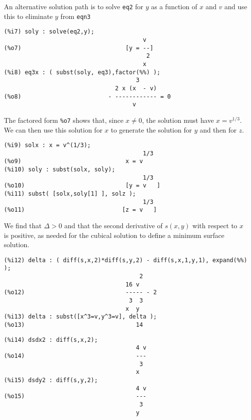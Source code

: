 \documentclass[12pt]{article}
\begin{document}
\smallskip

An alternative solution path is to solve \verb|eq2| for $y$ as a function of $x$ and $v$
  and use this to eliminate $y$ from \verb|eqn3|
\small
\begin{verbatim}
(%i7) soly : solve(eq2,y);
                                        v
(%o7)                              [y = --]
                                         2
                                        x
(%i8) eq3x : ( subst(soly, eq3),factor(%%) );
                                      3
                                2 x (x  - v)
(%o8)                         - ------------ = 0
                                     v
\end{verbatim}
\normalsize
The factored form \verb|%o7| shows that, since $x \neq 0$, the solution
  must have $x = v^{1/3}$.
We can then use this solution for $x$ to generate the solution for $y$
  and then for $z$.
\small
\begin{verbatim}
(%i9) solx : x = v^(1/3);
                                        1/3
(%o9)                              x = v
(%i10) soly : subst(solx, soly);
                                        1/3
(%o10)                             [y = v   ]
(%i11) subst( [solx,soly[1] ], solz );
                                        1/3
(%o11)                            [z = v   ]
\end{verbatim}
\normalsize
We find that $\Delta > 0$ and that  the second derivative of $s(x,y)$ with
  respect to $x$ is positive, as needed for the cubical solution to
  define a minimum surface solution.
\small
\begin{verbatim}
(%i12) delta : ( diff(s,x,2)*diff(s,y,2) - diff(s,x,1,y,1), expand(%%) );
                                       2
                                   16 v
(%o12)                             ----- - 2
                                    3  3
                                   x  y
(%i13) delta : subst([x^3=v,y^3=v], delta );
(%o13)                                14
\end{verbatim}
\newpage
\begin{verbatim}
(%i14) dsdx2 : diff(s,x,2);
                                      4 v
(%o14)                                ---
                                       3
                                      x
(%i15) dsdy2 : diff(s,y,2);
                                      4 v
(%o15)                                ---
                                       3
                                      y
\end{verbatim}
\normalsize
\end{document}
